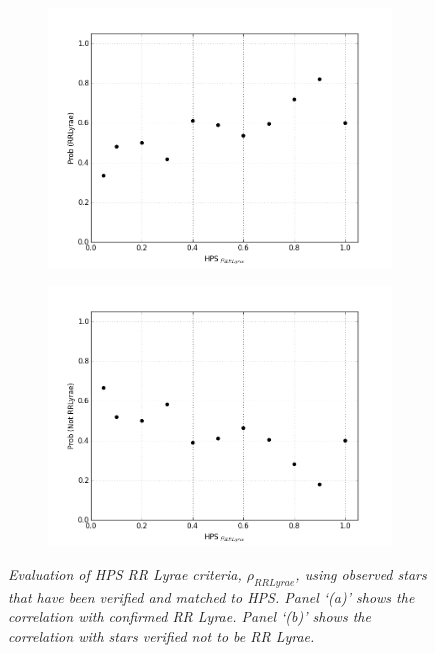 \documentclass[aps,prb,twocolumn,superscriptaddress]{revtex4-1}
\begin{document}
\begin{figure}
	\centering
	\begin{subfigure}{.5\textwidth}
	  \centering
	  \includegraphics[width=1\linewidth]{figures/NEW/probrr_vs_HPS.png}
		\caption{\it \small{ }}
		\label{fig:probrrHPS}
	\end{subfigure}%
	\begin{subfigure}{.5\textwidth}
	  \centering
			\includegraphics[width=1\linewidth]{figures/NEW/probnotrr_vs_HPS.png}
		\caption{\it \small{ }}
		\label{fig:probnotrrHPS}
	\end{subfigure}
	\caption{\it \small{Evaluation of HPS RR Lyrae criteria, $\rho_{RRLyrae}$, using observed stars that have been verified and matched to HPS.  Panel `(a)' shows the correlation with confirmed RR Lyrae.  Panel `(b)' shows the correlation with stars verified not to be RR Lyrae.}}
	\label{fig:HPSprob}
\end{figure}
\end{document}
